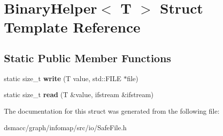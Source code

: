 \hypertarget{structBinaryHelper}{}\section{Binary\+Helper$<$ T $>$ Struct Template Reference}
\label{structBinaryHelper}
\subsection*{Static Public Member Functions}
\begin{DoxyCompactItemize}
\item 
\mbox{\label{structBinaryHelper_aa49839408d1bfac79142abeabd94534d}} 
static size\+\_\+t {\bfseries write} (T value, std\+::\+F\+I\+LE $\ast$file)
\item 
\mbox{\label{structBinaryHelper_a0499af3973f162199eeb53883f2d0d2a}} 
static size\+\_\+t {\bfseries read} (T \&value, ifstream \&ifstream)
\end{DoxyCompactItemize}


The documentation for this struct was generated from the following file\+:\begin{DoxyCompactItemize}
\item 
dsmacc/graph/infomap/src/io/Safe\+File.\+h\end{DoxyCompactItemize}
